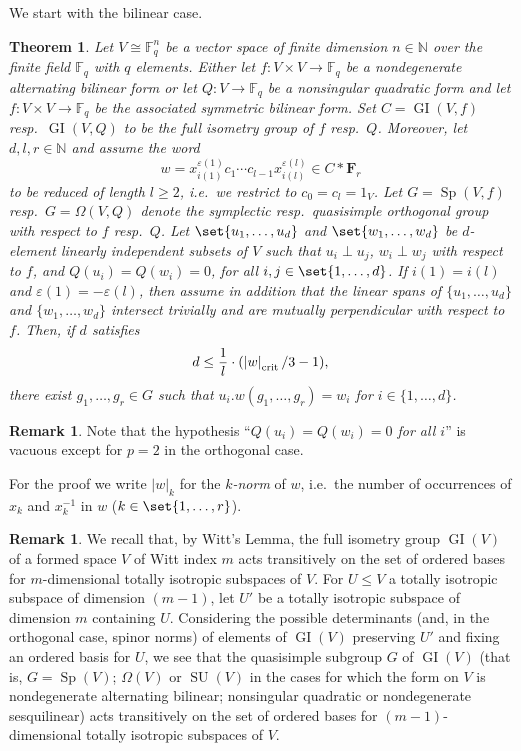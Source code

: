 \documentclass[a4paper,12pt]{amsproc}
\newcommand{\norm}[1]{\left\lvert#1\right\rvert}%
\DeclareMathOperator{\GI}{GI}%
\DeclareMathOperator{\Sp}{Sp}%
\DeclareMathOperator{\SU}{SU}%
\theoremstyle{plain}
\newtheorem{theorem}[definition]{Theorem}
\theoremstyle{definition}
\newtheorem{remark}[definition]{Remark}
\begin{document}
We start with the bilinear case.

\begin{theorem}\label{thm:orth_symp}
Let $V\cong\mathbb{F}_q^n$ be a vector space of finite dimension $n\in\mathbb{N}$ over the finite field $\mathbb{F}_q$ with $q$ elements. Either let $f\colon V\times V\to\mathbb{F}_q$ be a nondegenerate alternating bilinear form or let $Q\colon V \to\mathbb{F}_q$ 
be a nonsingular quadratic form and let $f\colon V\times V\to\mathbb{F}_q$ be the associated 
symmetric bilinear form. Set $C=\GI(V,f)$ resp.\ $\GI(V,Q)$ to be the full isometry group of $f$ resp.\ $Q$. Moreover, let $d,l,r\in\mathbb{N}$ and assume the word 
$$
w=x_{i(1)}^{\varepsilon(1)}c_1\cdots c_{l-1}x_{i(l)}^{\varepsilon(l)}\in C\ast\mathbf{F}_r
$$ 
to be reduced of length $l\geq 2$, i.e.\ we restrict to $c_0=c_l=1_V$. Let $G =\Sp(V,f)$ resp.\ $G=\Omega(V,Q)$ denote the symplectic resp.\ quasisimple orthogonal group with respect to $f$ resp.\ $Q$. Let $\set{u_1,\ldots,u_d}$ and $\set{w_1,\ldots,w_d}$ be $d$-element linearly independent subsets of $V$ such that $u_i\perp u_j$, $w_i\perp w_j$ with respect to $f$, 
and $Q(u_i)=Q(w_i)=0$, for all $i,j\in\set{1,\ldots,d}$. If $i(1)=i(l)$ and $\varepsilon(1) = -\varepsilon(l)$, then assume in addition that the linear spans of $\{u_1,\ldots,u_d\}$ and $\{w_1,\ldots,w_d\}$ intersect trivially and are mutually perpendicular with respect to $f$. Then, if $d$ satisfies
\begin{equation}\label{eq:symp_orth_cs}
d\leq\frac{1}{l}\cdot(\norm{w}_{\rm crit}/3-1),
\end{equation}
there exist $g_1,\ldots,g_r\in G$ such that $u_i.w(g_1,\ldots,g_r)=w_i$ for $i\in\{1,\ldots,d\}$.
\end{theorem}

\begin{remark}
Note that the hypothesis ``\emph{$Q(u_i)=Q(w_i)=0$ for all $i$}'' 
is vacuous except for $p=2$ in the orthogonal case.
\end{remark} 

For the proof we write $\norm{w}_k$ for the \emph{$k$-norm} of $w$, i.e.\ the number of occurrences of $x_k$ and $x_k^{-1}$ in $w$ ($k\in\set{1,\ldots,r}$). 

\begin{remark}\label{rmrk:Witt}
We recall that, by Witt's Lemma, the full isometry group $\GI(V)$ of a formed space $V$ of Witt index $m$ acts transitively on the set of ordered bases for $m$-dimensional totally isotropic subspaces of $V$. For $U \leq V$ a totally isotropic subspace of  dimension $(m-1)$, let $U'$ be a totally isotropic subspace of  dimension $m$ containing $U$. Considering the possible determinants (and, in the orthogonal case, spinor norms) of elements of $\GI(V)$ preserving $U'$ and fixing an ordered basis for $U$, we see that the quasisimple subgroup $G$ of $\GI(V)$ (that is, $G = \Sp(V)$; $\Omega(V)$ or $\SU(V)$ in the cases for which the form on $V$ is nondegenerate alternating bilinear; nonsingular quadratic or nondegenerate sesquilinear) acts transitively on the set of ordered bases for $(m-1)$-dimensional totally isotropic subspaces of $V$.
\end{remark}
\end{document}
